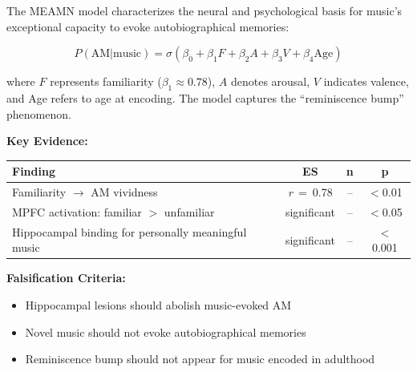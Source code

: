 \documentclass[9pt,onecolumn]{article}
\newcommand{\correlation}[1]{\textit{r}~=~#1}
\begin{document}
The MEAMN model characterizes the neural and psychological basis for music's exceptional capacity to evoke autobiographical memories:

\begin{equation}
P(\text{AM}|\text{music}) = \sigma\left(\beta_0 + \beta_1 F + \beta_2 A + \beta_3 V + \beta_4 \text{Age}\right)
\label{eq:meam}
\end{equation}

where $F$ represents familiarity ($\beta_1 \approx 0.78$), $A$ denotes arousal, $V$ indicates valence, and Age refers to age at encoding. The model captures the ``reminiscence bump'' phenomenon.

\textbf{Key Evidence:}
\begin{center}
\small
\begin{tabular}{@{}lccc@{}}
\toprule
\textbf{Finding} & \textbf{ES} & \textbf{n} & \textbf{p} \\
\midrule
Familiarity $\rightarrow$ AM vividness & \correlation{0.78} & -- & $<$0.01 \\
MPFC activation: familiar $>$ unfamiliar & significant & -- & $<$0.05 \\
Hippocampal binding for personally meaningful music & significant & -- & $<$0.001 \\
\bottomrule
\end{tabular}
\end{center}

\textbf{Falsification Criteria:}
\begin{itemize}[leftmargin=*, topsep=0pt, itemsep=0pt]
\item Hippocampal lesions should abolish music-evoked AM
\item Novel music should not evoke autobiographical memories
\item Reminiscence bump should not appear for music encoded in adulthood
\end{itemize}
\end{document}
